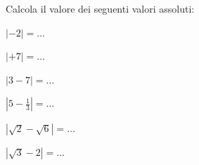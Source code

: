 \subsubsection*{}

\begin{esercizio}\label{ese:03.1}
Calcola il valore dei seguenti valori assoluti:
\begin{multicols}{3}
\begin{enumeratea}
\item $|-2|=\dots$
\item $|+7|=\dots$
\item $|3-7|=\dots$
\item $|5-\frac{1}{3}|=\dots$
\item $|\sqrt{2}-\sqrt{6}|=\dots$
\item $|\sqrt{3}-2|=\dots$
\end{enumeratea}
\end{multicols}
\end{esercizio}

